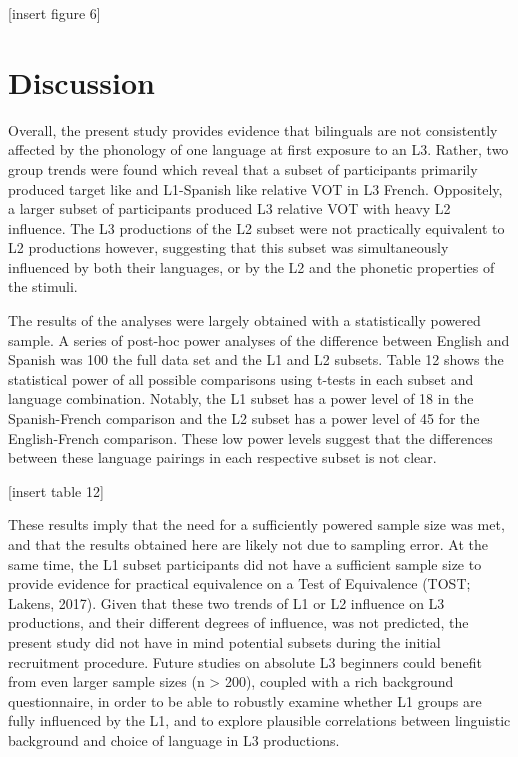 \documentclass[
  english,
  man]{apa6}
\begin{document}
{[}insert figure 6{]}

\hypertarget{discussion}{%
\section{Discussion}\label{discussion}}

Overall, the present study provides evidence that bilinguals are not consistently affected by the phonology of one language at first exposure to an L3.
Rather, two group trends were found which reveal that a subset of participants primarily produced target like and L1-Spanish like relative VOT in L3 French.
Oppositely, a larger subset of participants produced L3 relative VOT with heavy L2 influence. The L3 productions of the L2 subset were not practically equivalent to L2 productions however, suggesting that this subset was simultaneously influenced by both their languages, or by the L2 and the phonetic properties of the stimuli.

The results of the analyses were largely obtained with a statistically powered sample.
A series of post-hoc power analyses of the difference between English and Spanish was 100 the full data set and the L1 and L2 subsets.
Table 12 shows the statistical power of all possible comparisons using t-tests in each subset and language combination.
Notably, the L1 subset has a power level of 18 in the Spanish-French comparison and the L2 subset has a power level of 45 for the English-French comparison.
These low power levels suggest that the differences between these language pairings in each respective subset is not clear.

{[}insert table 12{]}

These results imply that the need for a sufficiently powered sample size was met, and that the results obtained here are likely not due to sampling error.
At the same time, the L1 subset participants did not have a sufficient sample size to provide evidence for practical equivalence on a Test of Equivalence (TOST; Lakens, 2017).
Given that these two trends of L1 or L2 influence on L3 productions, and their different degrees of influence, was not predicted, the present study did not have in mind potential subsets during the initial recruitment procedure.
Future studies on absolute L3 beginners could benefit from even larger sample sizes (n \textgreater{} 200), coupled with a rich background questionnaire, in order to be able to robustly examine whether L1 groups are fully influenced by the L1, and to explore plausible correlations between linguistic background and choice of language in L3 productions.
\end{document}
